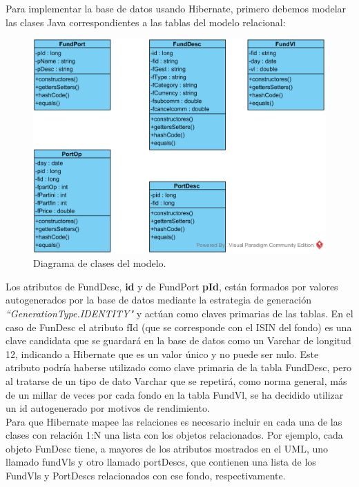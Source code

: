 \documentclass[12pt, a4paper]{book}
\begin{document}
Para implementar la base de datos usando Hibernate, primero debemos modelar las clases Java correspondientes a las tablas del modelo relacional:\\

\begin{figure}[htbp]
	\centering
	\includegraphics[width=\textwidth]{figuras/Diagrama_clases.png}
	\caption{Diagrama de clases del modelo.}
	\label{fig:mclases}
	\end {figure}

Los atributos de FundDesc, \textbf{id} y de FundPort \textbf{pId}, están formados por valores autogenerados por la base de datos mediante la estrategia de generación \textit{``GenerationType.IDENTITY"} y actúan como claves primarias de las tablas. En el caso de FunDesc el atributo fId (que se corresponde con el \gls{ISIN} del fondo) es una clave candidata que se guardará en la base de datos como un Varchar de longitud 12, indicando a Hibernate que es un valor único y no puede ser nulo. Este atributo podría haberse utilizado como clave primaria de la tabla FundDesc, pero al tratarse de un tipo de dato Varchar que se repetirá, como norma general, más de un millar de veces por cada fondo en la tabla FundVl, se ha decidido utilizar un id autogenerado por motivos de rendimiento.\\

Para que Hibernate mapee las relaciones es necesario incluir en cada una de las clases con relación 1:N una lista con los objetos relacionados. Por ejemplo, cada objeto FunDesc tiene, a mayores de los atributos mostrados en el \gls{UML}, uno llamado fundVls y otro llamado portDescs, que contienen una lista de los FundVls y PortDescs relacionados con ese fondo, respectivamente.\\
\end{document}

